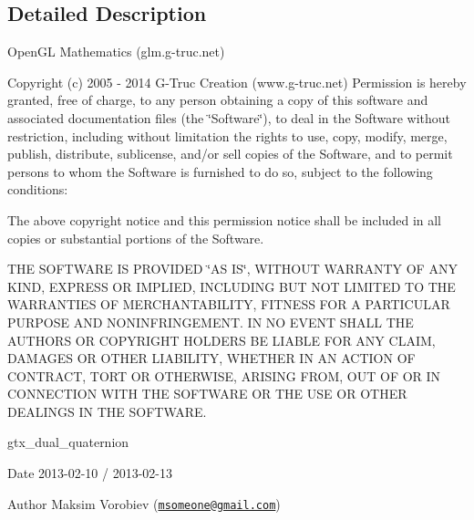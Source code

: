 \subsection{Detailed Description}
Open\+GL Mathematics (glm.\+g-\/truc.\+net)

Copyright (c) 2005 -\/ 2014 G-\/\+Truc Creation (www.\+g-\/truc.\+net) Permission is hereby granted, free of charge, to any person obtaining a copy of this software and associated documentation files (the \char`\"{}\+Software\char`\"{}), to deal in the Software without restriction, including without limitation the rights to use, copy, modify, merge, publish, distribute, sublicense, and/or sell copies of the Software, and to permit persons to whom the Software is furnished to do so, subject to the following conditions\+:

The above copyright notice and this permission notice shall be included in all copies or substantial portions of the Software.

T\+HE S\+O\+F\+T\+W\+A\+RE IS P\+R\+O\+V\+I\+D\+ED \char`\"{}\+A\+S I\+S\char`\"{}, W\+I\+T\+H\+O\+UT W\+A\+R\+R\+A\+N\+TY OF A\+NY K\+I\+ND, E\+X\+P\+R\+E\+SS OR I\+M\+P\+L\+I\+ED, I\+N\+C\+L\+U\+D\+I\+NG B\+UT N\+OT L\+I\+M\+I\+T\+ED TO T\+HE W\+A\+R\+R\+A\+N\+T\+I\+ES OF M\+E\+R\+C\+H\+A\+N\+T\+A\+B\+I\+L\+I\+TY, F\+I\+T\+N\+E\+SS F\+OR A P\+A\+R\+T\+I\+C\+U\+L\+AR P\+U\+R\+P\+O\+SE A\+ND N\+O\+N\+I\+N\+F\+R\+I\+N\+G\+E\+M\+E\+NT. IN NO E\+V\+E\+NT S\+H\+A\+LL T\+HE A\+U\+T\+H\+O\+RS OR C\+O\+P\+Y\+R\+I\+G\+HT H\+O\+L\+D\+E\+RS BE L\+I\+A\+B\+LE F\+OR A\+NY C\+L\+A\+IM, D\+A\+M\+A\+G\+ES OR O\+T\+H\+ER L\+I\+A\+B\+I\+L\+I\+TY, W\+H\+E\+T\+H\+ER IN AN A\+C\+T\+I\+ON OF C\+O\+N\+T\+R\+A\+CT, T\+O\+RT OR O\+T\+H\+E\+R\+W\+I\+SE, A\+R\+I\+S\+I\+NG F\+R\+OM, O\+UT OF OR IN C\+O\+N\+N\+E\+C\+T\+I\+ON W\+I\+TH T\+HE S\+O\+F\+T\+W\+A\+RE OR T\+HE U\+SE OR O\+T\+H\+ER D\+E\+A\+L\+I\+N\+GS IN T\+HE S\+O\+F\+T\+W\+A\+RE.

gtx\+\_\+dual\+\_\+quaternion

\begin{DoxyDate}{Date}
2013-\/02-\/10 / 2013-\/02-\/13 
\end{DoxyDate}
\begin{DoxyAuthor}{Author}
Maksim Vorobiev (\href{mailto:msomeone@gmail.com}{\tt msomeone@gmail.\+com}) 
\end{DoxyAuthor}
